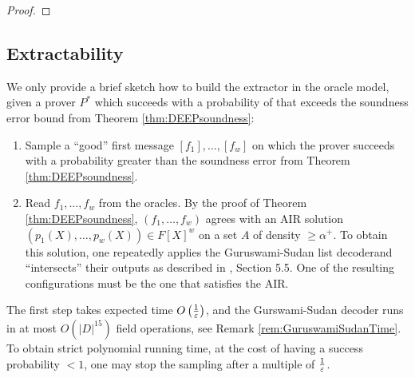 \documentclass[11pt,article,oneside]{memoir}
\theoremstyle{definition}
\theoremstyle{remark}
\begin{document}
\begin{proof}
\end{proof}


\subsection{Extractability}

We only provide a brief sketch how to build the extractor in the oracle model, given a prover $P^*$ which succeeds with a probability of that exceeds the soundness error bound from Theorem \ref{thm:DEEPsoundness}:
\begin{enumerate}
\item
Sample a “good” first message $[f_1],\ldots , [f_w]$ on which the prover succeeds with a probability greater than the soundness error from Theorem \ref{thm:DEEPsoundness}.

\item
Read $f_1, \ldots ,f_w$ from the oracles. 
By the proof of Theorem \ref{thm:DEEPsoundness}, $(f_1,\ldots ,f_w)$ agrees with an AIR solution $(p_1(X),\ldots ,p_w(X))\in F[X]^w$ on a set $A$ of density $\geq \alpha^+$. 
To obtain this solution, one repeatedly applies the Guruswami-Sudan list decoder\footnotemark and   “intersects” their outputs as described in \cite{ethSTARK}, Section 5.5.
One of the resulting configurations must be the one that satisfies the AIR.
%
\end{enumerate}

The first step takes expected time $O\left(\nicefrac{1}{\varepsilon}\right)$, and the Gurswami-Sudan decoder runs in at most $O\left(|D|^{15}\right)$ field operations, see Remark \ref{rem:GuruswamiSudanTime}.
To obtain strict polynomial running time, at the cost of having a success probability $<1$, one may stop the sampling after a multiple of $\nicefrac{1}{\varepsilon}$.
 
\end{document}
